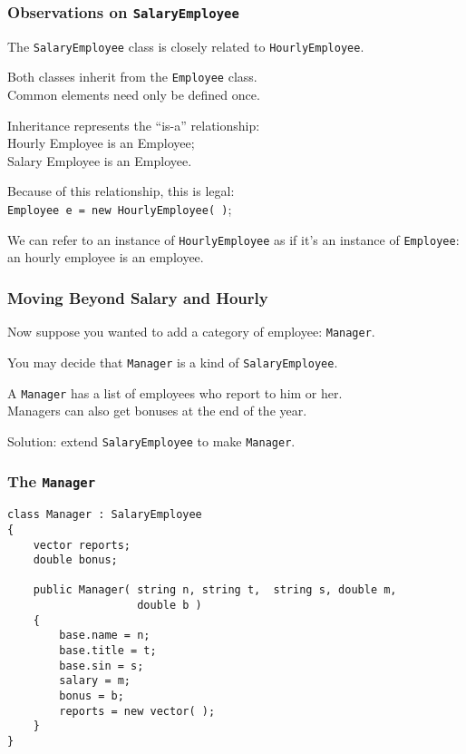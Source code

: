 \begin{frame}
\frametitle{Observations on \texttt{SalaryEmployee}}

The \texttt{SalaryEmployee} class is closely related to \texttt{HourlyEmployee}.

Both classes inherit from the \texttt{Employee} class.\\
\quad Common elements need only be defined once.

Inheritance represents the ``is-a'' relationship:\\
\quad Hourly Employee is an Employee;\\
\quad Salary Employee is an Employee.

Because of this relationship, this is legal:\\
\quad \texttt{Employee e = new HourlyEmployee( )};

We can refer to an instance of \texttt{HourlyEmployee} as if it's an instance of \texttt{Employee}: an hourly employee is an employee.

\end{frame}

\begin{frame}
\frametitle{Moving Beyond Salary and Hourly}
Now suppose you wanted to add a category of employee: \texttt{Manager}.

You may decide that \texttt{Manager} is a kind of \texttt{SalaryEmployee}.

A \texttt{Manager} has a list of employees who report to him or her.\\
Managers can also get bonuses at the end of the year.

Solution: extend \texttt{SalaryEmployee} to make \texttt{Manager}.

\end{frame}

\begin{frame}[fragile]
\frametitle{The \texttt{Manager}}

{\small
\begin{verbatim}
class Manager : SalaryEmployee
{
    vector reports;
    double bonus;

    public Manager( string n, string t,  string s, double m,
                    double b )
    {
        base.name = n;
        base.title = t;
        base.sin = s;
        salary = m;
        bonus = b;
        reports = new vector( );
    }
}
\end{verbatim}
}
\end{frame}

